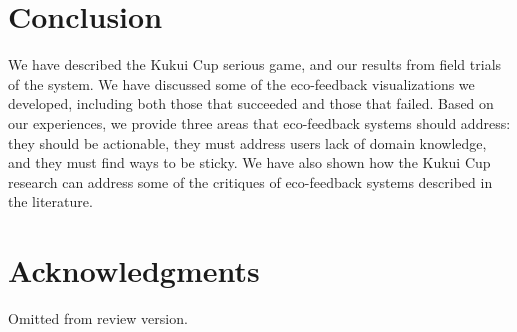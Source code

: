 \documentclass{sigchi}
\begin{document}
\section{Conclusion}

We have described the Kukui Cup serious game, and our results from field trials of the system. We have discussed some of the eco-feedback visualizations we developed, including both those that succeeded and those that failed. Based on our experiences, we provide three areas that eco-feedback systems should address: they should be actionable, they must address users lack of domain knowledge, and they must find ways to be sticky. We have also shown how the Kukui Cup research can address some of the critiques of eco-feedback systems described in the literature.


\section{Acknowledgments}

Omitted from review version.


%
%
%
%
%
\balance



\end{document}
